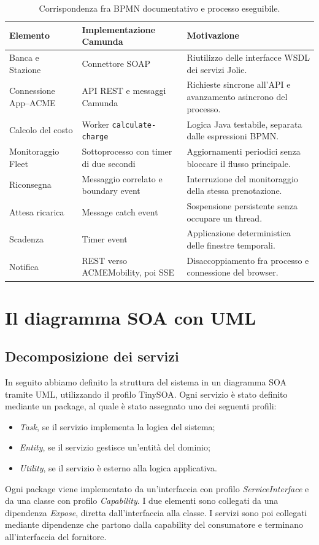 \documentclass[12pt,a4paper,twoside]{report}
\newcommand{\capitoloNum}[1]{\chapter{#1}}
\newcommand{\code}[1]{\texttt{#1}}
\begin{document}
\begin{table}[ht]
\centering
\small
\begin{tabularx}{\textwidth}{@{}l X X@{}}
\toprule
Elemento & Implementazione Camunda & Motivazione \\
\midrule
Banca e Stazione & Connettore SOAP &
Riutilizzo delle interfacce WSDL dei servizi Jolie. \\
Connessione App--ACME & API REST e messaggi Camunda &
Richieste sincrone all'API e avanzamento asincrono del processo. \\
Calcolo del costo & Worker \code{calculate-charge} &
Logica Java testabile, separata dalle espressioni BPMN. \\
Monitoraggio Fleet & Sottoprocesso con timer di due secondi &
Aggiornamenti periodici senza bloccare il flusso principale. \\
Riconsegna & Messaggio correlato e boundary event &
Interruzione del monitoraggio della stessa prenotazione. \\
Attesa ricarica & Message catch event &
Sospensione persistente senza occupare un thread. \\
Scadenza & Timer event &
Applicazione deterministica delle finestre temporali. \\
Notifica & REST verso ACMEMobility, poi SSE &
Disaccoppiamento fra processo e connessione del browser. \\
\bottomrule
\end{tabularx}
\caption{Corrispondenza fra BPMN documentativo e processo eseguibile.}
\label{tab:bpmn-implementation}
\end{table}

\capitoloNum{Il diagramma SOA con UML}

\section{Decomposizione dei servizi}

In seguito abbiamo definito la struttura del sistema in un diagramma SOA
tramite UML, utilizzando il profilo TinySOA. Ogni servizio è stato definito
mediante un package, al quale è stato assegnato uno dei seguenti profili:
\begin{itemize}
  \item \emph{Task}, se il servizio implementa la logica del sistema;
  \item \emph{Entity}, se il servizio gestisce un'entità del dominio;
  \item \emph{Utility}, se il servizio è esterno alla logica applicativa.
\end{itemize}
Ogni package viene implementato da un'interfaccia con profilo
\emph{ServiceInterface} e da una classe con profilo \emph{Capability}. I due
elementi sono collegati da una dipendenza \emph{Expose}, diretta
dall'interfaccia alla classe. I servizi sono poi collegati mediante
dipendenze che partono dalla capability del consumatore e terminano
all'interfaccia del fornitore.
\end{document}
